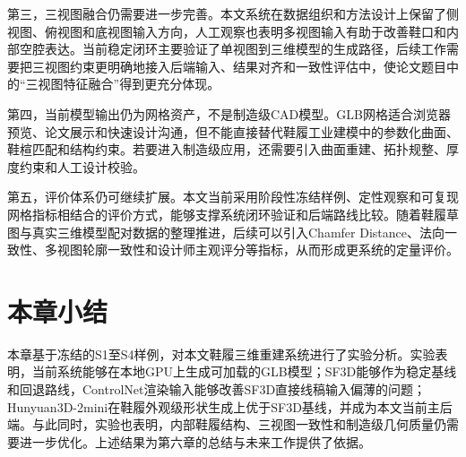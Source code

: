 第三，三视图融合仍需要进一步完善。本文系统在数据组织和方法设计上保留了侧视图、俯视图和底视图输入方向，人工观察也表明多视图输入有助于改善鞋口和内部空腔表达。当前稳定闭环主要验证了单视图到三维模型的生成路径，后续工作需要把三视图约束更明确地接入后端输入、结果对齐和一致性评估中，使论文题目中的“三视图特征融合”得到更充分体现。

第四，当前模型输出仍为网格资产，不是制造级CAD模型。GLB网格适合浏览器预览、论文展示和快速设计沟通，但不能直接替代鞋履工业建模中的参数化曲面、鞋楦匹配和结构约束。若要进入制造级应用，还需要引入曲面重建、拓扑规整、厚度约束和人工设计校验。

第五，评价体系仍可继续扩展。本文当前采用阶段性冻结样例、定性观察和可复现网格指标相结合的评价方式，能够支撑系统闭环验证和后端路线比较。随着鞋履草图与真实三维模型配对数据的整理推进，后续可以引入Chamfer Distance、法向一致性、多视图轮廓一致性和设计师主观评分等指标，从而形成更系统的定量评价。

\section{本章小结}

本章基于冻结的S1至S4样例，对本文鞋履三维重建系统进行了实验分析。实验表明，当前系统能够在本地GPU上生成可加载的GLB模型；SF3D能够作为稳定基线和回退路线，ControlNet渲染输入能够改善SF3D直接线稿输入偏薄的问题；Hunyuan3D-2mini在鞋履外观级形状生成上优于SF3D基线，并成为本文当前主后端。与此同时，实验也表明，内部鞋履结构、三视图一致性和制造级几何质量仍需要进一步优化。上述结果为第六章的总结与未来工作提供了依据。
